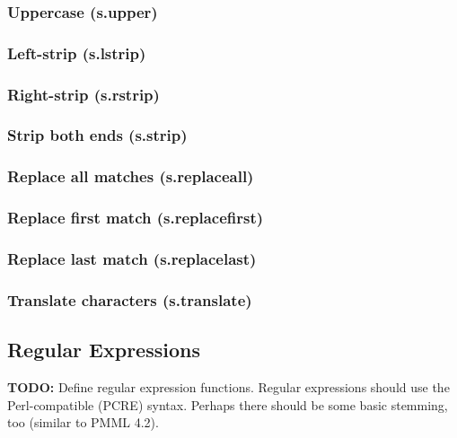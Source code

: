 \documentclass{article}
\theoremstyle{definition}
\begin{document}
\subsubsection{Uppercase (s.upper)}

\subsubsection{Left-strip (s.lstrip)}

\subsubsection{Right-strip (s.rstrip)}

\subsubsection{Strip both ends (s.strip)}

\subsubsection{Replace all matches (s.replaceall)}

\subsubsection{Replace first match (s.replacefirst)}

\subsubsection{Replace last match (s.replacelast)}

\subsubsection{Translate characters (s.translate)}

\subsection{Regular Expressions}

{\bf TODO:} Define regular expression functions.  Regular expressions should use the Perl-compatible (PCRE) syntax.  Perhaps there should be some basic stemming, too (similar to PMML 4.2).

\pagebreak
\end{document}
